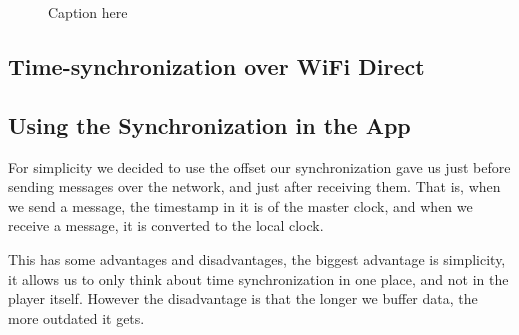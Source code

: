 \begin{figure}[htb]
    \centering
    \caption{Caption here}
    \label{fig:ntp_packets}
\end{figure}

\subsection{Time-synchronization over WiFi Direct}

\subsection{Using the Synchronization in the App}
For simplicity we decided to use the offset our synchronization gave us just before sending messages over the network, and just after receiving them.
That is, when we send a message, the timestamp in it is of the master clock, and when we receive a message, it is converted to the local clock.

This has some advantages and disadvantages, the biggest advantage is simplicity, it allows us to only think about time synchronization in one place, and not in the player itself.
However the disadvantage is that the longer we buffer data, the more outdated it gets.
